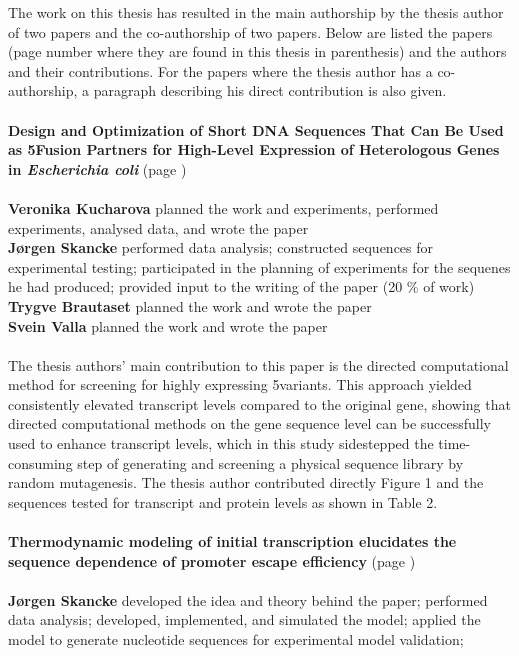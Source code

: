 The work on this thesis has resulted in the main authorship by the thesis
author of two papers and the co-authorship of two papers. Below are listed the
papers (page number where they are found in this thesis in parenthesis) and the
authors and their contributions. For the papers where the thesis author has a
co-authorship, a paragraph describing his direct contribution is also given.
\\
\\
\textbf{Design and Optimization of Short DNA Sequences That Can Be Used as
5\protect\ppp Fusion Partners for High-Level Expression of Heterologous Genes
in \textit{Escherichia coli}} (page \pageref{vero_paper})\\
\\
\textbf{Veronika Kucharova} planned the work and experiments, performed
experiments, analysed data, and wrote the paper\\
\textbf{J\o rgen Skancke} performed data analysis; constructed
sequences for experimental testing; participated in the planning of experiments
for the sequenes he had produced; provided input to the writing of the
paper (20 \% of work)\\
\textbf{Trygve Brautaset} planned the work and wrote the paper\\
\textbf{Svein Valla} planned the work and wrote the paper\\
\\
The thesis authors' main contribution to this paper is the directed
computational method for screening for highly expressing 5\ppp variants. This
approach yielded consistently elevated transcript levels compared to the
original gene, showing that directed computational methods on the gene sequence
level can be successfully used to enhance transcript levels, which in this
study sidestepped the time-consuming step of generating and screening a
physical sequence library by random mutagenesis. The thesis author contributed
directly Figure 1 and the sequences tested for transcript and protein levels as
shown in Table 2.
\\
\\
\textbf{Thermodynamic modeling of initial transcription elucidates the
sequence dependence of promoter escape efficiency} (page \pageref{chap:initiation_paper})\\
\\
\textbf{J\o rgen Skancke} developed the idea and theory behind the paper;
performed data analysis; developed, implemented, and simulated the model;
applied the model to generate nucleotide sequences for experimental model validation;
